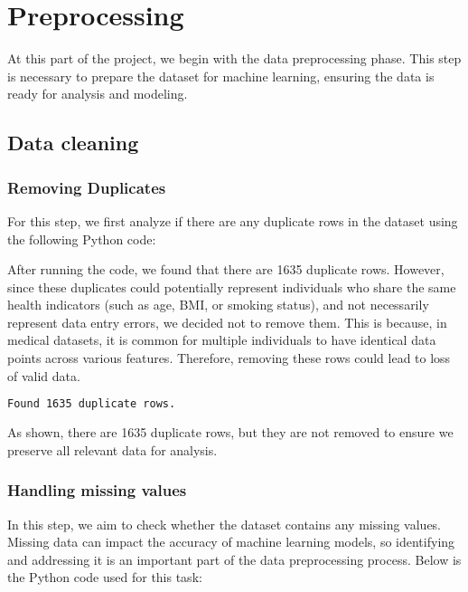 \section{Preprocessing}

At this part of the project, we begin with the data preprocessing phase. This step is necessary to prepare the dataset for machine learning, ensuring the data is ready for analysis and modeling.

\subsection{Data cleaning}
\subsubsection{Removing Duplicates}
For this step, we first analyze if there are any duplicate rows in the dataset using the following Python code:




After running the code, we found that there are 1635 duplicate rows. However, since these duplicates could potentially represent individuals who share the same health indicators (such as age, BMI, or smoking status), and not necessarily represent data entry errors, we decided not to remove them. This is because, in medical datasets, it is common for multiple individuals to have identical data points across various features. Therefore, removing these rows could lead to loss of valid data.

\begin{lstlisting}[language=bash]
Found 1635 duplicate rows.
\end{lstlisting}

As shown, there are 1635 duplicate rows, but they are not removed to ensure we preserve all relevant data for analysis.

\subsubsection{Handling missing values}

In this step, we aim to check whether the dataset contains any missing values. Missing data can impact the accuracy of machine learning models, so identifying and addressing it is an important part of the data preprocessing process. Below is the Python code used for this task:


